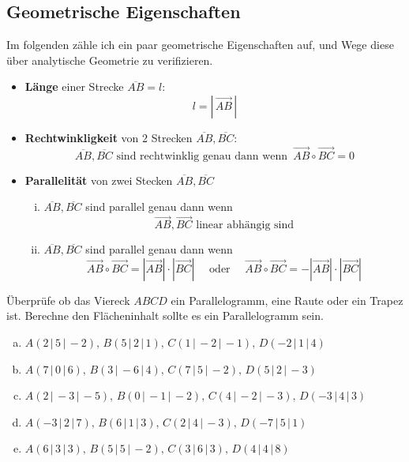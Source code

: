 \documentclass[a4paper,12pt]{article}
\newcommand{\Aufgabe}[2]{
	{
		\vspace*{0.3cm}
		\begin{tcolorbox}[breakable,colback=yellow!0,colframe=black!65!white,title=\textbf{Aufgabe #1:},width=\linewidth ]
			{#2}
		\end{tcolorbox}
		
		
	}
}
\begin{document}
	\subsection{Geometrische Eigenschaften}
	Im folgenden zähle ich ein paar geometrische Eigenschaften auf, und Wege diese über analytische Geometrie zu verifizieren.
	\begin{itemize}
		\item \textbf{Länge} einer Strecke $\overline{AB}=l$: \[l=\left\vert\, \vec{AB} \,\right \vert\]
		\item \textbf{Rechtwinkligkeit} von 2 Strecken $\overline{AB},\overline{BC}$:
		\[\overline{AB},\overline{BC} \text{ sind rechtwinklig genau dann wenn }\, \vec{AB}\circ \vec{BC}=0\]
		\item \textbf{Parallelität} von zwei Stecken $\overline{AB},\overline{BC}$
			\begin{enumerate}[(i)]
				\item $\overline{AB},\overline{BC}$ sind parallel genau dann wenn
					\[\vec{AB},\vec{BC} \text{ linear abhängig sind}\]
				\item $\overline{AB},\overline{BC}$ sind parallel genau dann wenn
					\[\vec{AB}\circ\vec{BC} = |\vec{AB}|\cdot |\vec{BC}|\quad\text{ oder }\quad\vec{AB}\circ\vec{BC} = -|\vec{AB}|\cdot |\vec{BC}|\]
			\end{enumerate}
	\end{itemize} 
	\Aufgabe{3.8.1 (Vierecke)}{
		Überprüfe ob das Viereck $ABCD$ ein Parallelogramm, eine Raute oder ein Trapez ist.
		Berechne den Flächeninhalt sollte es ein Parallelogramm sein.
		
			\begin{enumerate}[(a)]
				\item $A( 2\,|\,5 \,|\,-2 ),\, B( 5\,|\,2 \,|\, 1),\,C(1 \,|\,-2 \,|\,-1 ),\, D(-2 \,|\,1 \,|\,4 )$
				\item $A( 7\,|\,0 \,|\,6 ),\, B(3 \,|\,-6 \,|\, 4),\,C(7 \,|\,5 \,|\,-2 ),\, D( 5\,|\,2 \,|\, -3)$
				\item $A( 2\,|\,-3 \,|\,-5 ),\, B(0 \,|\, -1\,|\, -2),\,C(4 \,|\,-2 \,|\,-3 ),\, D(-3 \,|\, 4\,|\,3 )$
				\item $A( -3\,|\,2 \,|\,7 ),\, B( 6\,|\,1 \,|\, 3),\,C( 2\,|\,4 \,|\,-3 ),\, D( -7\,|\,5 \,|\,1 )$
				\item $A( 6\,|\,3 \,|\,3 ),\, B(5 \,|\, 5\,|\, -2),\,C( 3\,|\,6 \,|\,3 ),\, D( 4\,|\,4 \,|\,8 )$
			\end{enumerate}
		
	}
\end{document}
